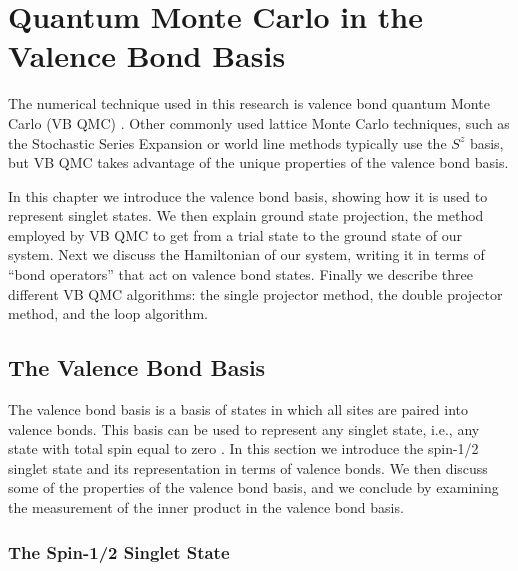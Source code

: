 
\chapter{Quantum Monte Carlo in the Valence Bond Basis}
The numerical technique used in this research is valence bond quantum Monte Carlo (VB QMC) \cite{Sandvik_vbqmc,Sandvik2007}.
Other commonly used lattice Monte Carlo techniques, such as the Stochastic Series Expansion  \cite{Sylji2002} or world line \cite{Evertz2003} methods typically use the $S^z$ basis, but VB QMC takes advantage of the unique properties of the valence bond basis.  

In this chapter we introduce the valence bond basis, showing how it is used to represent singlet states.  
We then explain ground state projection, the method employed by VB QMC to get from a trial state to the ground state of our system.
Next we discuss the Hamiltonian of our system, writing it in terms of ``bond operators'' that act on valence bond states.
Finally we describe three different VB QMC algorithms: the single projector method, the double projector method, and the loop algorithm.

\section{The Valence Bond Basis} \label{sec:basis}
The valence bond basis is a basis of states in which all sites are paired into valence bonds.  
This basis can be used to represent any singlet state, i.e., any state with total spin equal to zero \cite{Anderson1973, Anderson1974}.
In this section we introduce the spin-1/2 singlet state and its representation in terms of valence bonds.
We then discuss some of the properties of the valence bond basis,
and we conclude by examining the measurement of the inner product in the valence bond basis.
\subsection{The Spin-1/2 Singlet State}

